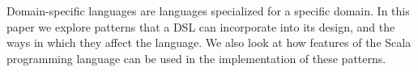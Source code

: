 Domain-specific languages are languages specialized for a specific domain.
In this paper we explore patterns that a DSL can incorporate into its design, and the ways in which they affect the language.
We also look at how features of the Scala programming language can be used in the implementation of these patterns.